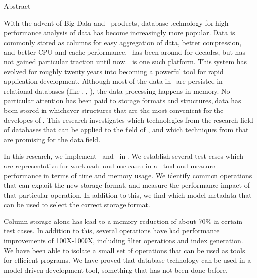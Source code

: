 {\centering

    {\Huge Abstract}
    \vspace{1cm}
    
    With the advent of Big Data and \bd~products, database technology for high-performance analysis of data has become increasingly more popular. Data is commonly stored as columns for easy aggregation of data, better compression, and better CPU and cache performance. \mdd~has been around for decades, but has not gained particular traction until now. \gap~is one such platform. This system has evolved for roughly twenty years into becoming a powerful tool for rapid application development. Although most of the data in \gap~are persisted in relational databases (like \oracle, \mssql, \mysql), the data processing happens in-memory. No particular attention has been paid to storage formats and structures, data has been stored in whichever structures that are the most convenient for the developes of \gap. This research investigates which technologies from the research field of databases that can be applied to the field of \mdd, and which techniques from \mdd that are promising for the data field.

    In this research, we implement \cs~and \de~in \gap. We establish several test cases which are representative for workloads and use cases in a \mdd~tool and measure performance in terms of time and memory usage. We identify common operations that can exploit the new storage format, and measure the performance impact of that particular operation. In addition to this, we find which model metadata that can be used to select the correct storage format.

    Column storage alone has lead to a memory reduction of about 70\% in certain test cases. In addition to this, several operations have had performance improvements of 100X-1000X, including filter operations and index generation. We have been able to isolate a small set of operations that can be used as tools for efficient programs. We have proved that database technology can be used in a model-driven development tool, something that has not been done before.
   

}
\clearpage
